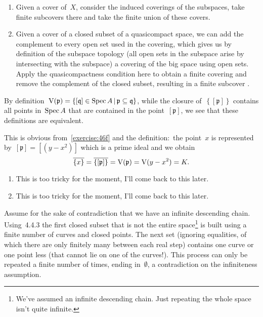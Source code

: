 \begin{exercise}
  \begin{enumerate}
    \item Given a cover of~$X$, consider the induced coverings of the subspaces, take finite subcovers there and take the finite union of these covers.

    \item Given a cover of a closed subset of a quasicompact space, we can add the complement to every open set used in the covering, which gives us by definition of the subspace topology (all open sets in the subspace arise by intersecting with the subspace) a covering of the big space using open sets. Apply the quasicompactness condition here to obtain a finite covering and remove the complement of the closed subset, resulting in a finite subcover .
  \end{enumerate}
\end{exercise}

\begin{exercise}
  \label{exercise:46f}
  By definition~$\operatorname{V}(\mathfrak{p})=\left\{ [\mathfrak{q}]\in\operatorname{Spec} A\,|\, \mathfrak{p}\subseteq\mathfrak{q}\right\}$, while the closure of~$\left\{ [\mathfrak{p}] \right\}$ contains all points in~$\operatorname{Spec} A$ that are contained in the point~$[\mathfrak{p}]$, we see that these definitions are equivalent.
\end{exercise}

\begin{exercise}
  This is obvious from~\autoref{exercise:46f} and the definition:~the point~$x$ is represented by~$[\mathfrak{p}]=[(y-x^2)]$ which is a prime ideal and we obtain
  \begin{equation}
    \overline{\left\{ x \right\}}=\overline{\left\{ [\mathfrak{p}] \right\}}=\operatorname{V}(\mathfrak{p})=\operatorname{V}(y-x^2)=K.
  \end{equation}
\end{exercise}

\begin{exercise} %
  \begin{enumerate}
    \item This is too tricky for the moment, I'll come back to this later.

    \item This is too tricky for the moment, I'll come back to this later.
  \end{enumerate}
\end{exercise}

\begin{exercise}
  Assume for the sake of contradiction that we have an infinite descending chain. Using~4.4.3 the first closed subset that is not the entire space\footnote{We've assumed an infinite descending chain. Just repeating the whole space isn't quite infinite.} is built using a finite number of curves and closed points. The next set (ignoring equalities, of which there are only finitely many between each real step) contains one curve or one point less (that cannot lie on one of the curves!). This process can only be repeated a finite number of times, ending in~$\emptyset$, a contradiction on the infiniteness assumption.
\end{exercise}


